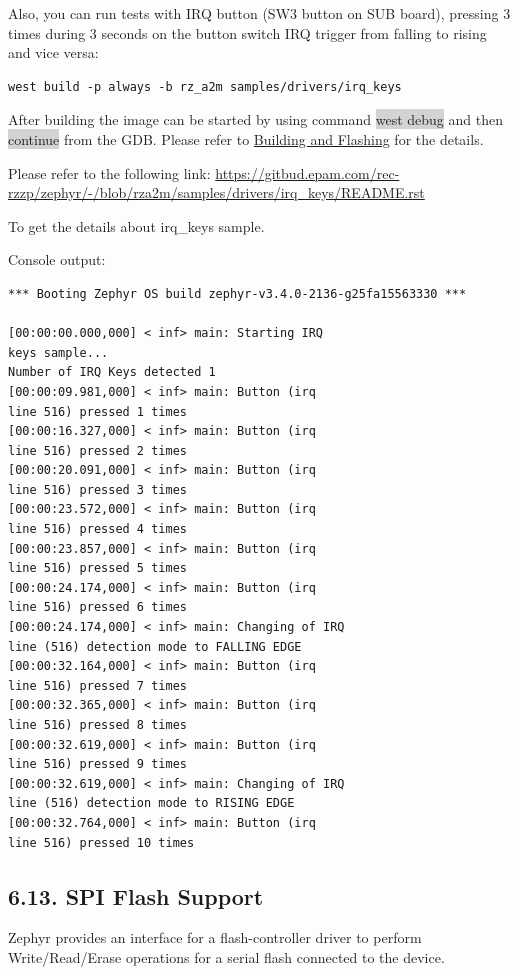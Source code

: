 \documentclass[11pt,a4paper,oneside]{article}
\begin{document}
Also, you can run tests with IRQ button (SW3 button on SUB board),
pressing 3 times during 3 seconds on the button switch IRQ trigger from
falling to rising and vice versa:

\begin{lstlisting}
west build -p always -b rz_a2m samples/drivers/irq_keys
\end{lstlisting}

After building the image can be started by using command \colorbox{lightgray}{west debug}
and then \colorbox{lightgray}{continue} from the GDB. Please refer to
\hyperref[building-and-flashing]{Building and Flashing} for the
details.

Please refer to the following link:
\url{https://gitbud.epam.com/rec-rzzp/zephyr/-/blob/rza2m/samples/drivers/irq_keys/README.rst}

To get the details about irq\_keys sample.

Console output:

\begin{lstlisting}
*** Booting Zephyr OS build zephyr-v3.4.0-2136-g25fa15563330 ***

[00:00:00.000,000] < inf> main: Starting IRQ
keys sample...
Number of IRQ Keys detected 1
[00:00:09.981,000] < inf> main: Button (irq
line 516) pressed 1 times
[00:00:16.327,000] < inf> main: Button (irq
line 516) pressed 2 times
[00:00:20.091,000] < inf> main: Button (irq
line 516) pressed 3 times
[00:00:23.572,000] < inf> main: Button (irq
line 516) pressed 4 times
[00:00:23.857,000] < inf> main: Button (irq
line 516) pressed 5 times
[00:00:24.174,000] < inf> main: Button (irq
line 516) pressed 6 times
[00:00:24.174,000] < inf> main: Changing of IRQ
line (516) detection mode to FALLING EDGE
[00:00:32.164,000] < inf> main: Button (irq
line 516) pressed 7 times
[00:00:32.365,000] < inf> main: Button (irq
line 516) pressed 8 times
[00:00:32.619,000] < inf> main: Button (irq
line 516) pressed 9 times
[00:00:32.619,000] < inf> main: Changing of IRQ
line (516) detection mode to RISING EDGE
[00:00:32.764,000] < inf> main: Button (irq
line 516) pressed 10 times
\end{lstlisting}

\subsection*{6.13. SPI Flash Support}\label{spi-flash-support}

Zephyr provides an interface for a flash-controller driver to perform
Write/Read/Erase operations for a serial flash connected to the device.
\end{document}
